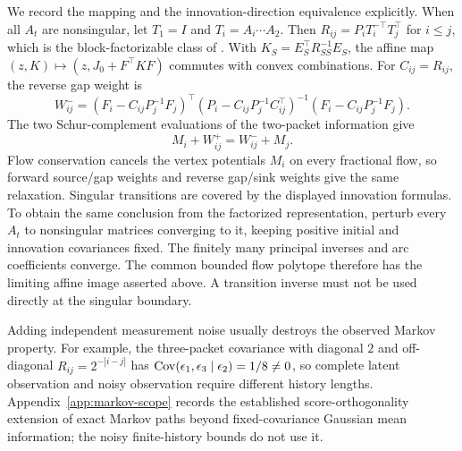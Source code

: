 We record the mapping and the innovation-direction equivalence explicitly. When all $A_t$ are nonsingular, let $T_1=I$ and
$T_i=A_i\cdots A_2$. Then
$R_{ij}=P_iT_i^{-\top}T_j^\top$ for $i\le j$, which is the block-factorizable
class of \citet{Lee2026}. With
$K_S=E_S^\top R_{SS}^{-1}E_S$, the affine map
$(z,K)\mapsto(z,J_0+F^\top KF)$ commutes with convex combinations.
For $C_{ij}=R_{ij}$, the reverse gap weight is
\[
 W^-_{ij}=(F_i-C_{ij}P_j^{-1}F_j)^\top
 (P_i-C_{ij}P_j^{-1}C_{ij}^\top)^{-1}
 (F_i-C_{ij}P_j^{-1}F_j).
\]
The two Schur-complement evaluations of the two-packet information give
\begin{equation}
 M_i+W^+_{ij}=W^-_{ij}+M_j.
 \label{eq:forward-reverse}
\end{equation}
Flow conservation cancels the vertex potentials $M_i$ on every fractional
flow, so forward source/gap weights and reverse gap/sink weights give the
same relaxation. Singular transitions are covered by the displayed innovation
formulas. To obtain the same conclusion from the factorized representation,
perturb every $A_t$ to nonsingular matrices converging to it, keeping positive
initial and innovation covariances fixed. The finitely many principal
inverses and arc coefficients converge. The common bounded flow polytope
therefore has the limiting affine image asserted above. A transition inverse
must not be used directly at the singular boundary.

Adding independent measurement noise usually destroys the observed Markov
property. For example, the three-packet covariance with diagonal $2$ and
off-diagonal $R_{ij}=2^{-|i-j|}$ has
$\operatorname{Cov}(\epsilon_1,\epsilon_3\mid\epsilon_2)=1/8\ne0$, so complete latent
observation and noisy observation require different history lengths.
Appendix~\ref{app:markov-scope} records the established score-orthogonality
extension of exact Markov paths beyond fixed-covariance Gaussian mean
information; the noisy finite-history bounds do not use it.

